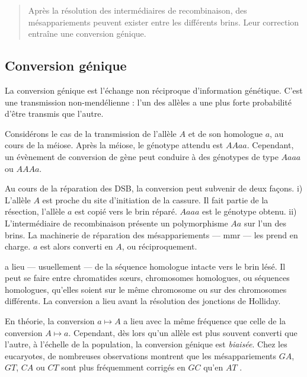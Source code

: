 \documentclass[11pt, oneside]{scrartcl}
\begin{document}


\begin{quote}
Après la résolution des intermédiaires de recombinaison, des mésappariements
peuvent exister entre les différents brins. Leur correction entraîne une
conversion génique.
\end{quote}

\subsection{Conversion génique}
\label{sec:orgheadline2}
La conversion génique est l'échange non réciproque d'information génétique.
C'est une transmission non-mendélienne : l'un des allèles a une plus forte
probabilité d'être transmis que l'autre\cite{chen_gene_2007}. 

Considérons le cas de la transmission de l'allèle \(A\) et de son homologue \(a\),
au cours de la méiose. Après la méiose, le génotype attendu est \(AAaa\).
Cependant, un évènement de conversion de gène peut conduire à des génotypes de
type \(Aaaa\) ou \(AAAa\). 

Au cours de la réparation des DSB, la conversion peut subvenir de deux façons.
i) L'allèle \(A\) est proche du site d'initiation de la cassure. Il fait partie de
la résection, l'allèle \(a\) est copié vers le brin réparé. \(Aaaa\) est le génotype
obtenu. ii) L'intermédiaire de recombinaison présente un polymorphisme \(Aa\) sur
l'un des brins. La machinerie de réparation des mésappariements --- \ac{mmr} ---
les prend en charge. \(a\) est alors converti en \(A\), ou réciproquement. 

 a lieu --- usuellement --- de la séquence homologue
intacte vers le brin lésé. Il peut se faire entre chromatides sœurs, chromosomes
homologues, ou séquences homologues, qu'elles soient sur le même chromosome ou
sur des chromosomes différents\cite{chen_gene_2007}. La conversion a lieu avant
la résolution des jonctions de Holliday. 


En théorie, la conversion \(a \mapsto A\) a lieu avec la même fréquence que celle
de la conversion \(A \mapsto a\). Cependant, dès lors qu'un allèle est plus
souvent converti que l'autre, à l'échelle de la population, la conversion
génique est \emph{biaisée}. Chez les eucaryotes, de nombreuses observations montrent
que les mésappariements \(GA\), \(GT\), \(CA\) ou \(CT\) sont plus fréquemment corrigés
en \(GC\) qu'en \(AT\) \cite{duret_biased_2009}. 
\end{document}
